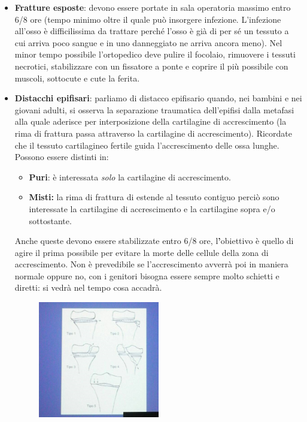 \begin{itemize}
\item
  \textbf{Fratture esposte}: devono essere portate in sala operatoria massimo entro 6/8 ore (tempo minimo oltre il quale può insorgere infezione. L'infezione all'osso è difficilissima da trattare perché l'osso è già di per sé un tessuto a cui arriva poco sangue e in uno danneggiato ne arriva ancora meno). Nel minor tempo possibile l'ortopedico deve pulire il focolaio, rimuovere i tessuti necrotici, stabilizzare con un fissatore a ponte e coprire il più possibile con muscoli, sottocute e cute la ferita.
\item
  \textbf{Distacchi epifisari}: parliamo di distacco epifisario quando, nei bambini e nei giovani adulti, si osserva la separazione traumatica dell'epifisi dalla metafasi alla quale aderisce per interposizione della cartilagine di accrescimento (la rima di frattura passa attraverso la cartilagine di accrescimento). Ricordate che il tessuto cartilagineo fertile guida l'accrescimento delle ossa lunghe. Possono essere distinti in:

\begin{itemize}
\item
  \textbf{Puri}: è interessata \emph{solo} la cartilagine di accrescimento.
\item
  \textbf{Misti:} la rima di frattura di estende al tessuto contiguo perciò sono interessate la cartilagine di accrescimento e la cartilagine sopra e/o sottostante.
\end{itemize}

Anche queste devono essere stabilizzate entro 6/8 ore,
l\textbf{'}obiettivo è quello di agire il prima possibile per evitare la morte delle cellule della zona di accrescimento. Non è prevedibile se l'accrescimento avverrà poi in maniera normale oppure no, con i genitori bisogna essere sempre molto schietti e diretti: si vedrà nel tempo cosa
accadrà.

\begin{figure}[!ht]
\centering
\includegraphics[width=0.5\textwidth]{002/image11.png}
\end{figure}


\end{itemize}
